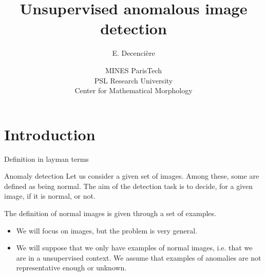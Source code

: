\documentclass[xcolor=pdftex,dvipsnames,table,mathserif]{beamer}
\title{Unsupervised anomalous image detection}
\author{E. Decencière}
\date{MINES ParisTech\\
  PSL Research University\\
  Center for Mathematical Morphology
}
\begin{document}
\frame{\titlepage}


\section{Introduction}

\begin{frame}{Definition in layman terms}


  \begin{block}{Anomaly detection}
  Let us consider a given set of images. Among these, some  are defined as being \alert{normal}. The aim of the detection task is to decide, for a given image, if it is normal, or not.

  The definition of normal images is given through a set of examples.
  \end{block}

  \begin{itemize}
  \item We will focus on images, but the problem is very general.
  \item We will suppose that we only have examples of normal images, i.e. that we are in a \alert{unsupervised} context. We assume that examples of anomalies are not representative enough or unknown.
  \end{itemize}



\end{frame}
\end{document}
